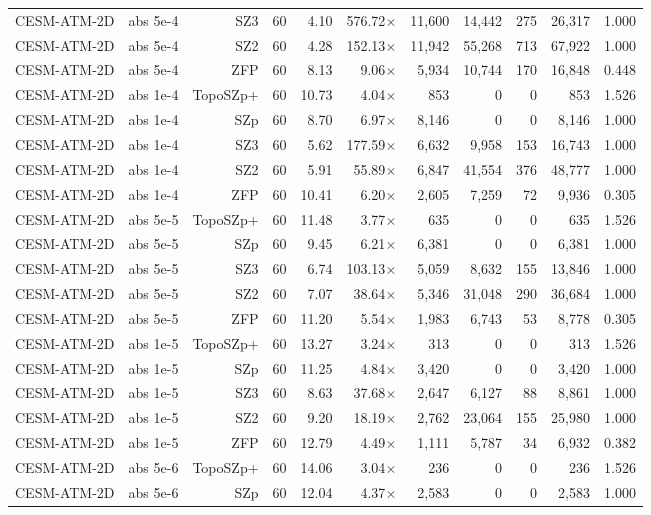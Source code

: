 \begin{tabular}{lrrrrrrrrrr}
CESM-ATM-2D & abs 5e-4 & SZ3 & 60 & 4.10 & 576.72$\times$ & 11,600 & 14,442 & 275 & 26,317 & 1.000 \\
CESM-ATM-2D & abs 5e-4 & SZ2 & 60 & 4.28 & 152.13$\times$ & 11,942 & 55,268 & 713 & 67,922 & 1.000 \\
CESM-ATM-2D & abs 5e-4 & ZFP & 60 & 8.13 & 9.06$\times$ & 5,934 & 10,744 & 170 & 16,848 & 0.448 \\
CESM-ATM-2D & abs 1e-4 & TopoSZp+ & 60 & 10.73 & 4.04$\times$ & 853 & 0 & 0 & 853 & 1.526 \\
CESM-ATM-2D & abs 1e-4 & SZp & 60 & 8.70 & 6.97$\times$ & 8,146 & 0 & 0 & 8,146 & 1.000 \\
CESM-ATM-2D & abs 1e-4 & SZ3 & 60 & 5.62 & 177.59$\times$ & 6,632 & 9,958 & 153 & 16,743 & 1.000 \\
CESM-ATM-2D & abs 1e-4 & SZ2 & 60 & 5.91 & 55.89$\times$ & 6,847 & 41,554 & 376 & 48,777 & 1.000 \\
CESM-ATM-2D & abs 1e-4 & ZFP & 60 & 10.41 & 6.20$\times$ & 2,605 & 7,259 & 72 & 9,936 & 0.305 \\
CESM-ATM-2D & abs 5e-5 & TopoSZp+ & 60 & 11.48 & 3.77$\times$ & 635 & 0 & 0 & 635 & 1.526 \\
CESM-ATM-2D & abs 5e-5 & SZp & 60 & 9.45 & 6.21$\times$ & 6,381 & 0 & 0 & 6,381 & 1.000 \\
CESM-ATM-2D & abs 5e-5 & SZ3 & 60 & 6.74 & 103.13$\times$ & 5,059 & 8,632 & 155 & 13,846 & 1.000 \\
CESM-ATM-2D & abs 5e-5 & SZ2 & 60 & 7.07 & 38.64$\times$ & 5,346 & 31,048 & 290 & 36,684 & 1.000 \\
CESM-ATM-2D & abs 5e-5 & ZFP & 60 & 11.20 & 5.54$\times$ & 1,983 & 6,743 & 53 & 8,778 & 0.305 \\
CESM-ATM-2D & abs 1e-5 & TopoSZp+ & 60 & 13.27 & 3.24$\times$ & 313 & 0 & 0 & 313 & 1.526 \\
CESM-ATM-2D & abs 1e-5 & SZp & 60 & 11.25 & 4.84$\times$ & 3,420 & 0 & 0 & 3,420 & 1.000 \\
CESM-ATM-2D & abs 1e-5 & SZ3 & 60 & 8.63 & 37.68$\times$ & 2,647 & 6,127 & 88 & 8,861 & 1.000 \\
CESM-ATM-2D & abs 1e-5 & SZ2 & 60 & 9.20 & 18.19$\times$ & 2,762 & 23,064 & 155 & 25,980 & 1.000 \\
CESM-ATM-2D & abs 1e-5 & ZFP & 60 & 12.79 & 4.49$\times$ & 1,111 & 5,787 & 34 & 6,932 & 0.382 \\
CESM-ATM-2D & abs 5e-6 & TopoSZp+ & 60 & 14.06 & 3.04$\times$ & 236 & 0 & 0 & 236 & 1.526 \\
CESM-ATM-2D & abs 5e-6 & SZp & 60 & 12.04 & 4.37$\times$ & 2,583 & 0 & 0 & 2,583 & 1.000 \\

\end{tabular}
